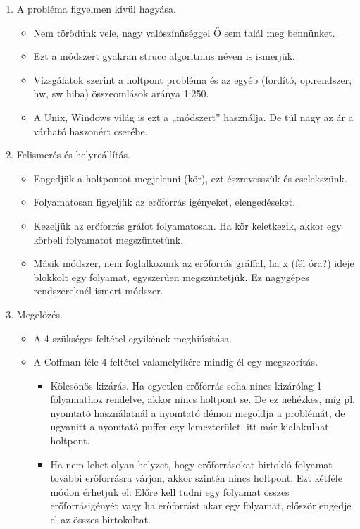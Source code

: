\documentclass[margin=0px]{article}
\begin{document}
	\begin{enumerate}
		\item A probléma figyelmen kívül hagyása.
		\begin{itemize}
			\item Nem törődünk vele, nagy valószínűséggel Ő sem talál meg bennünket.
			\item Ezt a módszert gyakran strucc algoritmus néven is ismerjük.
			\item Vizsgálatok szerint a holtpont probléma és az egyéb (fordító, op.rendszer, hw, sw hiba) összeomlások aránya 1:250.
			\item A Unix, Windows világ is ezt a „módszert”	használja. De túl nagy az ár a várható haszonért cserébe.
		\end{itemize}
		\item Felismerés és helyreállítás.
		\begin{itemize}
			\item Engedjük a holtpontot megjelenni (kör), ezt észrevesszük és cselekszünk.
			\item Folyamatosan figyeljük az erőforrás igényeket, elengedéseket.
			\item Kezeljük az erőforrás gráfot folyamatosan. Ha kör keletkezik, akkor egy körbeli folyamatot megszüntetünk.
			\item Másik módszer, nem foglalkozunk az erőforrás gráffal, ha x (fél óra?) ideje 	blokkolt egy folyamat, egyszerűen megszüntetjük. Ez nagygépes rendszereknél ismert módszer.
		\end{itemize} 
		\item Megelőzés.
		\begin{itemize}
			\item A 4 szükséges feltétel egyikének meghiúsítása.
			\item A Coffman féle 4 feltétel valamelyikére mindig él egy megszorítás.
			\begin{itemize}
				\item Kölcsönös kizárás. Ha egyetlen erőforrás soha nincs kizárólag 1 folyamathoz rendelve, akkor nincs holtpont se. De ez nehézkes, míg pl. nyomtató használatnál a
				nyomtató démon megoldja a problémát, de ugyanitt a nyomtató puffer egy lemezterület, itt már kialakulhat holtpont.
				\item Ha nem lehet olyan helyzet, hogy erőforrásokat birtokló folyamat további erőforrásra várjon, akkor szintén nincs holtpont. Ezt kétféle módon érhetjük el: Előre kell tudni egy folyamat összes erőforrásigényét vagy ha erőforrást akar egy folyamat, először engedje el az összes birtokoltat.

\end{itemize}
\end{itemize}
\end{enumerate}
\end{document}
